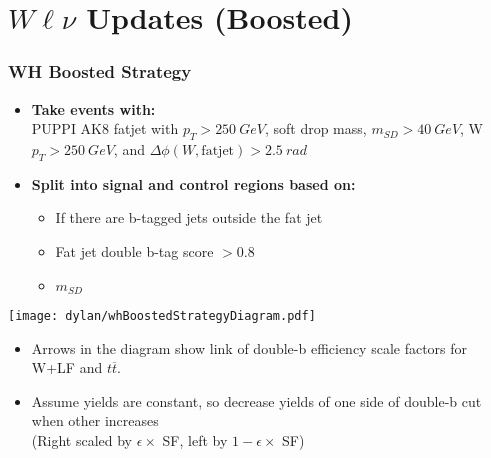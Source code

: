 \documentclass{beamer}
\begin{document}
\section{$W\ell\nu$ Updates (Boosted)}

\begin{frame}
  \frametitle{WH Boosted Strategy}
      \begin{itemize}
      \item {\bf Take events with:} \\
        PUPPI AK8 fatjet with $p_T > \SI{250}{GeV}$,
        soft drop mass, $m_{SD} > \SI{40}{GeV}$,
        W $p_T > \SI{250}{GeV}$, and
        $\Delta \phi(W, \mathrm{fatjet}) > \SI{2.5}{rad}$
      \item {\bf Split into signal and control regions based on:}
        \begin{itemize}
        \item If there are b-tagged jets outside the fat jet
        \item Fat jet double b-tag score $> 0.8$
        \item $m_{SD}$
        \end{itemize}
      \end{itemize}
\end{frame}

\begin{frame}
  \vspace{-60pt}
  \hspace*{0.1\linewidth}
  \texttt{[image: dylan/whBoostedStrategyDiagram.pdf]}
  \begin{itemize}
  \item Arrows in the diagram show link of double-b efficiency scale factors for W+LF and $t\overline{t}$.
  \item Assume yields are constant, so decrease yields of one side of double-b cut when other increases \\
    (Right scaled by $\epsilon \times $ SF, left by $1 - \epsilon \times $ SF)
  \end{itemize}
\end{frame}
\end{document}
